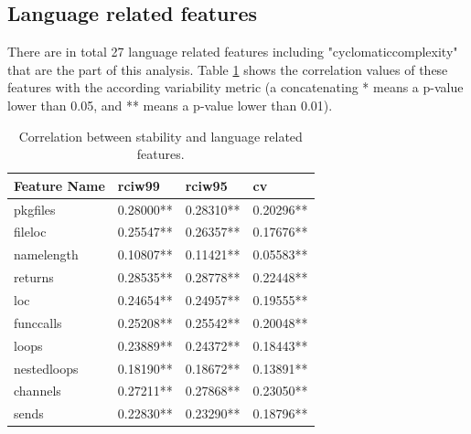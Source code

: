 \documentclass{seal_thesis}
\begin{document}
\subsection{Language related features}
\label{Language related features}

There are in total 27 language related features including "cyclomaticcomplexity" \cite{shepperd1988critique} that are the part of this analysis. Table \ref{table:languagefeatures} shows the correlation values of these features with the according variability metric (a concatenating * means a p-value lower than 0.05, and ** means a p-value lower than 0.01).

\begin{table}[H]
	\centering
	\caption{Correlation between stability and language related features.}
	\label{table:languagefeatures}
	\begin{tabular}{@{}llll@{}}
		Feature Name & rciw99 & rciw95 & cv \\
		\toprule
		pkgfiles & \cellcolor[HTML]{FFCC99}0.28000** & \cellcolor[HTML]{FFCC99}0.28310** & \cellcolor[HTML]{99CCFF}0.20296** \\
		fileloc & \cellcolor[HTML]{FFCC99}0.25547** & \cellcolor[HTML]{FFCC99}0.26357** & \cellcolor[HTML]{99CCFF}0.17676** \\
		namelength & \cellcolor[HTML]{99CCFF}0.10807** & \cellcolor[HTML]{99CCFF}0.11421** & \cellcolor[HTML]{3366FF}0.05583** \\
		returns & \cellcolor[HTML]{FFCC99}0.28535** & \cellcolor[HTML]{FFCC99}0.28778** & \cellcolor[HTML]{C0C0C0}0.22448** \\
		loc & \cellcolor[HTML]{C0C0C0}0.24654** & \cellcolor[HTML]{C0C0C0}0.24957** & \cellcolor[HTML]{99CCFF}0.19555** \\
		funccalls & \cellcolor[HTML]{C0C0C0}0.25208** & \cellcolor[HTML]{FFCC99}0.25542** & \cellcolor[HTML]{99CCFF}0.20048** \\
		loops & \cellcolor[HTML]{C0C0C0}0.23889** & \cellcolor[HTML]{C0C0C0}0.24372** & \cellcolor[HTML]{99CCFF}0.18443** \\
		nestedloops & \cellcolor[HTML]{99CCFF}0.18190** & \cellcolor[HTML]{99CCFF}0.18672** & \cellcolor[HTML]{99CCFF}0.13891** \\
		channels & \cellcolor[HTML]{FFCC99}0.27211** & \cellcolor[HTML]{FFCC99}0.27868** & \cellcolor[HTML]{C0C0C0}0.23050** \\
		sends & \cellcolor[HTML]{C0C0C0}0.22830** & \cellcolor[HTML]{C0C0C0}0.23290** & \cellcolor[HTML]{99CCFF}0.18796** \\

\end{tabular}
\end{table}
\end{document}
